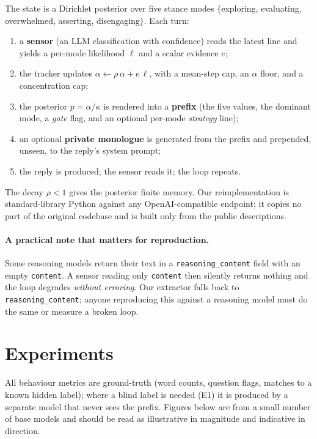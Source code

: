 \documentclass[11pt]{article}
\begin{document}
The state is a Dirichlet posterior over five stance modes
$\{$exploring, evaluating, overwhelmed, asserting, disengaging$\}$. Each turn:
\begin{enumerate}
\item a \textbf{sensor} (an LLM classification with confidence) reads the latest
line and yields a per-mode likelihood $\ell$ and a scalar evidence $e$;
\item the tracker updates $\alpha \leftarrow \rho\,\alpha + e\,\ell$, with a
mean-step cap, an $\alpha$ floor, and a concentration cap;
\item the posterior $p=\alpha/\kappa$ is rendered into a \textbf{prefix} (the
five values, the dominant mode, a \emph{gate} flag, and an optional per-mode
\emph{strategy} line);
\item an optional \textbf{private monologue} is generated from the prefix and
prepended, unseen, to the reply's system prompt;
\item the reply is produced; the sensor reads it; the loop repeats.
\end{enumerate}
The decay $\rho<1$ gives the posterior finite memory. Our reimplementation is
standard-library Python against any OpenAI-compatible endpoint; it copies no
part of the original codebase and is built only from the public descriptions.

\paragraph{A practical note that matters for reproduction.} Some reasoning
models return their text in a \texttt{reasoning\_content} field with an empty
\texttt{content}. A sensor reading only \texttt{content} then silently returns
nothing and the loop degrades \emph{without erroring}. Our extractor falls back
to \texttt{reasoning\_content}; anyone reproducing this against a reasoning model
must do the same or measure a broken loop.

\section{Experiments}

All behaviour metrics are ground-truth (word counts, question flags, matches to a
known hidden label); where a blind label is needed (E1) it is produced by a
separate model that never sees the prefix. Figures below are from a small number
of base models and should be read as illustrative in magnitude and indicative in
direction.
\end{document}
